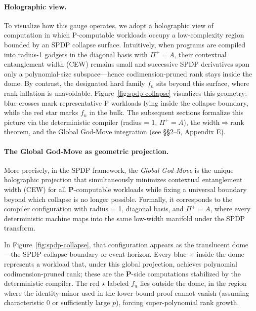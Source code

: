 \documentclass[12pt]{article}
\theoremstyle{definition}
\theoremstyle{definition}
\theoremstyle{remark}
\theoremstyle{remark}
\begin{document}
\paragraph{Holographic view.}
To visualize how this gauge operates, we adopt a holographic view of computation in which P-computable workloads occupy a low-complexity region bounded by an SPDP collapse surface. Intuitively, when programs are compiled into radius-1 gadgets in the diagonal basis with $\Pi^+ = A$, their contextual entanglement width (CEW) remains small and successive SPDP derivatives span only a polynomial-size subspace---hence codimension-pruned rank stays inside the dome. By contrast, the designated hard family $f_n$ sits beyond this surface, where rank inflation is unavoidable. Figure~\ref{fig:spdp-collapse} visualizes this geometry: blue crosses mark representative P workloads lying inside the collapse boundary, while the red star marks $f_n$ in the bulk. The subsequent sections formalize this picture via the deterministic compiler (radius = 1, $\Pi^+ = A$), the width$\Rightarrow$rank theorem, and the Global God-Move integration (see \S\S2--5, Appendix E).

\paragraph{The Global God-Move as geometric projection.}
More precisely, in the SPDP framework, the \emph{Global God-Move} is the unique holographic projection that simultaneously minimizes contextual entanglement width (CEW) for all $\mathbf{P}$-computable workloads while fixing a universal boundary beyond which collapse is no longer possible. Formally, it corresponds to the compiler configuration with radius = 1, diagonal basis, and $\Pi^+ = A$, where every deterministic machine maps into the same low-width manifold under the SPDP transform.

In Figure~\ref{fig:spdp-collapse}, that configuration appears as the translucent dome---the SPDP collapse boundary or event horizon. Every blue $\times$ inside the dome represents a workload that, under this global projection, achieves polynomial codimension-pruned rank; these are the $\mathbf{P}$-side computations stabilized by the deterministic compiler. The red $\star$ labeled $f_n$ lies outside the dome, in the region where the identity-minor used in the lower-bound proof cannot vanish (assuming characteristic 0 or sufficiently large $p$), forcing super-polynomial rank growth.
\end{document}
